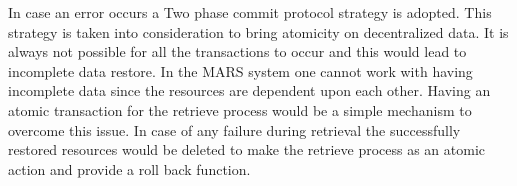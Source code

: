 In case an error occurs a Two phase commit protocol strategy is adopted. This strategy is taken into consideration to bring atomicity on decentralized data.
It is always not possible for all the transactions to occur and this would lead to incomplete data restore. In the MARS system one cannot work with having
incomplete data since the resources are dependent upon each other. Having an atomic transaction for the retrieve process would be a simple mechanism to overcome
this issue. In case of any failure during retrieval the successfully restored resources would be deleted to make the retrieve process as an atomic action and
provide a roll back function. 
